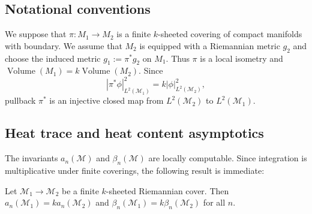\documentclass{amsart}
\begin{document}
\subsection{Notational conventions}
We
suppose that
$\pi:M_1\rightarrow M_2$ is a finite
$k$-sheeted covering of compact manifolds with boundary. We assume that $M_2$ is equipped with a Riemannian
metric $g_2$ and choose the induced metric $g_1:=\pi^*g_2$ on $M_1$. Thus $\pi$ is a local isometry and
$\operatorname{Volume}(M_1)=k\operatorname{Volume}(M_2)$.  Since 
\begin{equation}\label{eqn-2.a}
|\pi^*\phi|^2_{L^2(\mathcal{M}_1)}=k|\phi|^2_{L^2(\mathcal{M}_2)},
\end{equation}
pullback $\pi^*$ is an injective closed map from $L^2(\mathcal{M}_2)$ to $L^2(\mathcal{M}_1)$. 

\subsection{Heat trace and heat content asymptotics} The invariants $a_n(\mathcal{M})$ and
$\beta_n(\mathcal{M})$ are locally computable. Since integration is multiplicative under finite coverings,
the following result is immediate:

\begin{theorem}\label{thm-2.1} Let $\mathcal{M}_1\rightarrow\mathcal{M}_2$ be a finite $k$-sheeted Riemannian
cover. Then
$a_n(\mathcal{M}_1)=ka_n(\mathcal{M}_2)$ and $\beta_n(\mathcal{M}_1)=k\beta_n(\mathcal{M}_2)$ for all
$n$.
\end{theorem}
\end{document}
